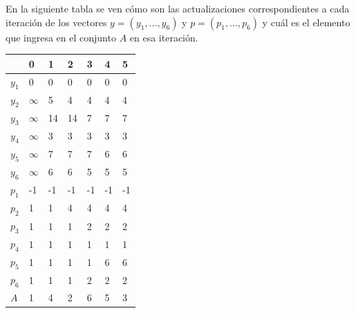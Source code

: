 \documentclass[10pt]{article}
\begin{document}
En la siguiente tabla se ven cómo son las actualizaciones correspondientes a cada iteración de los vectores $y=\left(y_{1}, \ldots, y_{6}\right)$ y $p=\left(p_{1}, \ldots, p_{6}\right)$ y cuál es el elemento que ingresa en el conjunto $A$ en esa iteración.

\begin{center}
\begin{tabular}{|l|l|l|l|l|l|l|}
\hline
 & 0 & 1 & 2 & 3 & 4 & 5 \\
\hline
$y_{1}$ & 0 & 0 & 0 & 0 & 0 & 0 \\
\hline
$y_{2}$ & $\infty$ & 5 & 4 & 4 & 4 & 4 \\
\hline
$y_{3}$ & $\infty$ & 14 & 14 & 7 & 7 & 7 \\
\hline
$y_{4}$ & $\infty$ & 3 & 3 & 3 & 3 & 3 \\
\hline
$y_{5}$ & $\infty$ & 7 & 7 & 7 & 6 & 6 \\
\hline
$y_{6}$ & $\infty$ & 6 & 6 & 5 & 5 & 5 \\
\hline
$p_{1}$ & -1 & -1 & -1 & -1 & -1 & -1 \\
\hline
$p_{2}$ & 1 & 1 & 4 & 4 & 4 & 4 \\
\hline
$p_{3}$ & 1 & 1 & 1 & 2 & 2 & 2 \\
\hline
$p_{4}$ & 1 & 1 & 1 & 1 & 1 & 1 \\
\hline
$p_{5}$ & 1 & 1 & 1 & 1 & 6 & 6 \\
\hline
$p_{6}$ & 1 & 1 & 1 & 2 & 2 & 2 \\
\hline
$A$ & 1 & 4 & 2 & 6 & 5 & 3 \\
\hline
\end{tabular}
\end{center}
\end{document}
